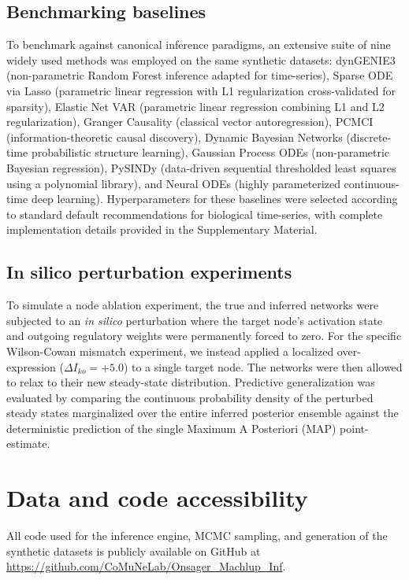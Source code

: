 \documentclass[10pt, aps, rmp,  twocolumn, superscriptaddress, floatfix, showkeys]{revtex4-2}
\begin{document}
\subsection{Benchmarking baselines}
To benchmark against canonical inference paradigms, an extensive suite of nine widely used methods was employed on the same synthetic datasets: dynGENIE3 (non-parametric Random Forest inference adapted for time-series), Sparse ODE via Lasso (parametric linear regression with L1 regularization cross-validated for sparsity), Elastic Net VAR (parametric linear regression combining L1 and L2 regularization), Granger Causality (classical vector autoregression), PCMCI (information-theoretic causal discovery), Dynamic Bayesian Networks (discrete-time probabilistic structure learning), Gaussian Process ODEs (non-parametric Bayesian regression), PySINDy (data-driven sequential thresholded least squares using a polynomial library), and Neural ODEs (highly parameterized continuous-time deep learning). Hyperparameters for these baselines were selected according to standard default recommendations for biological time-series, with complete implementation details provided in the Supplementary Material.

\subsection{In silico perturbation experiments}
To simulate a node ablation experiment, the true and inferred networks were subjected to an \textit{in silico} perturbation where the target node's activation state and outgoing regulatory weights were permanently forced to zero. For the specific Wilson-Cowan mismatch experiment, we instead applied a localized over-expression ($\Delta I_{ko} = +5.0$) to a single target node. The networks were then allowed to relax to their new steady-state distribution. Predictive generalization was evaluated by comparing the continuous probability density of the perturbed steady states marginalized over the entire inferred posterior ensemble against the deterministic prediction of the single Maximum A Posteriori (MAP) point-estimate.

\vspace{0.2 cm}

\section*{Data and code accessibility}
All code used for the inference engine, MCMC sampling, and generation of the synthetic datasets is publicly available on GitHub at \url{https://github.com/CoMuNeLab/Onsager_Machlup_Inf}.
\end{document}
